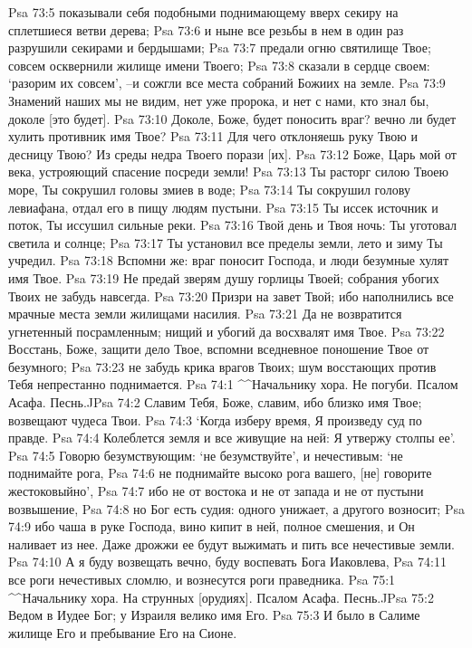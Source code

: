 Psa 73:5  показывали себя подобными поднимающему вверх секиру на сплетшиеся ветви дерева;
Psa 73:6  и ныне все резьбы в нем в один раз разрушили секирами и бердышами;
Psa 73:7  предали огню святилище Твое; совсем осквернили жилище имени Твоего;
Psa 73:8  сказали в сердце своем: `разорим их совсем', --и сожгли все места собраний Божиих на земле.
Psa 73:9  Знамений наших мы не видим, нет уже пророка, и нет с нами, кто знал бы, доколе [это будет].
Psa 73:10  Доколе, Боже, будет поносить враг? вечно ли будет хулить противник имя Твое?
Psa 73:11  Для чего отклоняешь руку Твою и десницу Твою? Из среды недра Твоего порази [их].
Psa 73:12  Боже, Царь мой от века, устрояющий спасение посреди земли!
Psa 73:13  Ты расторг силою Твоею море, Ты сокрушил головы змиев в воде;
Psa 73:14  Ты сокрушил голову левиафана, отдал его в пищу людям пустыни.
Psa 73:15  Ты иссек источник и поток, Ты иссушил сильные реки.
Psa 73:16  Твой день и Твоя ночь: Ты уготовал светила и солнце;
Psa 73:17  Ты установил все пределы земли, лето и зиму Ты учредил.
Psa 73:18  Вспомни же: враг поносит Господа, и люди безумные хулят имя Твое.
Psa 73:19  Не предай зверям душу горлицы Твоей; собрания убогих Твоих не забудь навсегда.
Psa 73:20  Призри на завет Твой; ибо наполнились все мрачные места земли жилищами насилия.
Psa 73:21  Да не возвратится угнетенный посрамленным; нищий и убогий да восхвалят имя Твое.
Psa 73:22  Восстань, Боже, защити дело Твое, вспомни вседневное поношение Твое от безумного;
Psa 73:23  не забудь крика врагов Твоих; шум восстающих против Тебя непрестанно поднимается.
Psa 74:1  ^^Начальнику хора. Не погуби. Псалом Асафа. Песнь.^^
Psa 74:2  Славим Тебя, Боже, славим, ибо близко имя Твое; возвещают чудеса Твои.
Psa 74:3  `Когда изберу время, Я произведу суд по правде.
Psa 74:4  Колеблется земля и все живущие на ней: Я утвержу столпы ее'.
Psa 74:5  Говорю безумствующим: `не безумствуйте', и нечестивым: `не поднимайте рога,
Psa 74:6  не поднимайте высоко рога вашего, [не] говорите жестоковыйно',
Psa 74:7  ибо не от востока и не от запада и не от пустыни возвышение,
Psa 74:8  но Бог есть судия: одного унижает, а другого возносит;
Psa 74:9  ибо чаша в руке Господа, вино кипит в ней, полное смешения, и Он наливает из нее. Даже дрожжи ее будут выжимать и пить все нечестивые земли.
Psa 74:10  А я буду возвещать вечно, буду воспевать Бога Иаковлева,
Psa 74:11  все роги нечестивых сломлю, и вознесутся роги праведника.
Psa 75:1  ^^Начальнику хора. На струнных [орудиях]. Псалом Асафа. Песнь.^^
Psa 75:2  Ведом в Иудее Бог; у Израиля велико имя Его.
Psa 75:3  И было в Салиме жилище Его и пребывание Его на Сионе.

